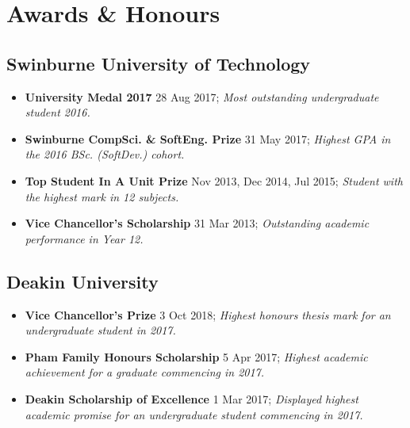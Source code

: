 \vspace{-3mm}
\section{Awards \& Honours}
\small

\begin{multicols}{2}
\raggedright

\subsection{Swinburne University of Technology}

\begin{itemize}
  \item \textbf{University Medal 2017} 28 Aug 2017; \textit{Most outstanding undergraduate student 2016.}
  \item \textbf{Swinburne CompSci. \& SoftEng. Prize} 31 May 2017; \textit{Highest GPA in the 2016 BSc. (SoftDev.) cohort.}
  \item \textbf{Top Student In A Unit Prize} Nov 2013, Dec 2014, Jul 2015; \textit{Student with the highest mark in 12 subjects.}
  \item \textbf{Vice Chancellor's Scholarship} 31 Mar 2013; \textit{Outstanding academic performance in Year 12.}
\end{itemize}

\subsection{Deakin University}

\begin{itemize}
  \item \textbf{Vice Chancellor's Prize} 3 Oct 2018; \textit{Highest honours thesis mark for an undergraduate student in 2017.}
  \item \textbf{Pham Family Honours Scholarship} 5 Apr 2017; \textit{Highest academic achievement for a graduate commencing in 2017.}
  \item \textbf{Deakin Scholarship of Excellence} 1 Mar 2017; \textit{Displayed highest academic promise for an undergraduate student commencing in 2017.}
\end{itemize}


\end{multicols}
